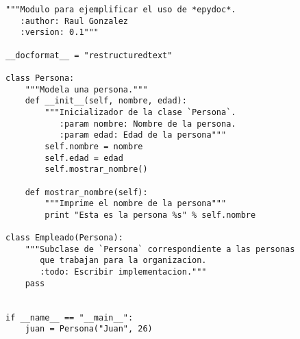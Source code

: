 \begin{lstlisting}
"""Modulo para ejemplificar el uso de *epydoc*. 
   :author: Raul Gonzalez 
   :version: 0.1"""  
  
__docformat__ = "restructuredtext"  
  
class Persona:  
    """Modela una persona."""  
    def __init__(self, nombre, edad):  
        """Inicializador de la clase `Persona`. 
           :param nombre: Nombre de la persona. 
           :param edad: Edad de la persona"""  
        self.nombre = nombre  
        self.edad = edad  
        self.mostrar_nombre()  
  
    def mostrar_nombre(self):  
        """Imprime el nombre de la persona"""  
        print "Esta es la persona %s" % self.nombre  
  
class Empleado(Persona):  
    """Subclase de `Persona` correspondiente a las personas 
       que trabajan para la organizacion. 
       :todo: Escribir implementacion."""  
    pass  
  
  
if __name__ == "__main__":  
    juan = Persona("Juan", 26) 
\end{lstlisting}
